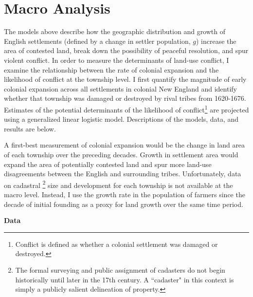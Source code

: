 \documentclass[11pt]{article}
\begin{document}





\section{Macro Analysis}
The models above describe how the geographic distribution and growth of English settlements (defined by a change in settler population, $g$) increase the area of contested land, break down the possibility of peaceful resolution, and spur violent conflict.
In order to measure the determinants of land-use conflict, I examine the relationship between the rate of colonial expansion and the likelihood of conflict at the township level. I first quantify the magnitude of early colonial expansion across all settlements in colonial New England and identify whether that township was damaged or destroyed by rival tribes from 1620-1676. Estimates of the potential determinants of the likelihood of conflict\footnote{Conflict is defined as whether a colonial settlement was damaged or destroyed.} are projected using a generalized linear logistic model. Descriptions of the models, data, and results are below.

A first-best measurement of colonial expansion would be the change in land area of each township over the preceding decades. Growth in settlement area would expand the area of potentially contested land and spur more land-use disagreements between the English and surrounding tribes. Unfortunately, data on cadastral \footnote{The formal surveying and public assignment of cadasters do not begin historically until later in the 17th century. A ``cadaster" in this context is simply a publicly salient delineation of property.} size and development for each township is not available at the macro level. Instead, I use the growth rate in the population of farmers since the decade of initial founding as a proxy for land growth over the same time period.

\noindent\textbf{Data}
\end{document}
